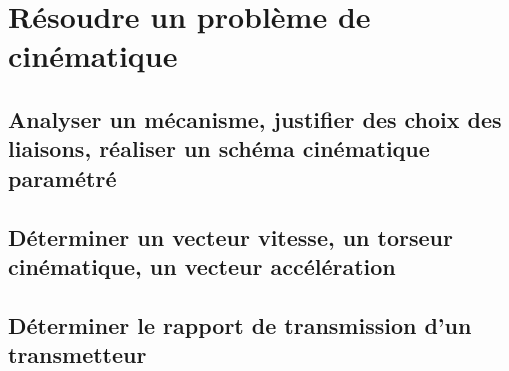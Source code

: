 \setchapterpreamble[u]{\margintoc} 
\chapter{Résoudre un problème de cinématique} 
\section{Analyser un mécanisme, justifier des choix des liaisons, réaliser un schéma cinématique paramétré} 
\section{Déterminer un vecteur vitesse, un torseur cinématique, un vecteur accélération} 
\section{Déterminer le rapport de transmission d'un transmetteur} 
\graphicspath{{\repStyle/png/}{../CIN/CIN-03-Transmetteurs/21_TrainSimple/images/}} 
 
 
\graphicspath{{\repStyle/png/}{../CIN/CIN-03-Transmetteurs/22_TrainSimple/images/}} 
 
 
\graphicspath{{\repStyle/png/}{../CIN/CIN-03-Transmetteurs/23_TrainSimple/images/}} 
 
 
\graphicspath{{\repStyle/png/}{../CIN/CIN-03-Transmetteurs/24_TrainSimple/images/}} 
 
 
\graphicspath{{\repStyle/png/}{../CIN/CIN-03-Transmetteurs/25_Cheville/images/}} 
 
 
\graphicspath{{\repStyle/png/}{../CIN/CIN-03-Transmetteurs/26_RoueMotrice/images/}} 
 
 
\graphicspath{{\repStyle/png/}{../CIN/CIN-03-Transmetteurs/27_TrainEpi/images/}} 
 
 
\graphicspath{{\repStyle/png/}{../CIN/CIN-03-Transmetteurs/28_TrainEpi/images/}} 
 
 
\graphicspath{{\repStyle/png/}{../CIN/CIN-03-Transmetteurs/29_TrainEpi/images/}} 
 
 
